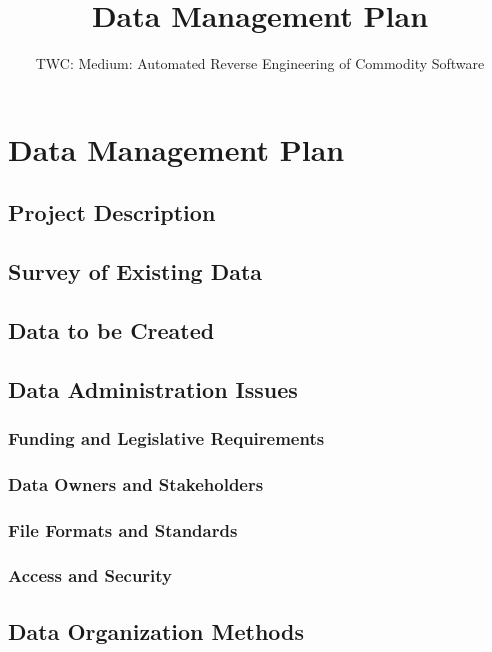 \documentclass[letterpaper,twoside,11pt,headings=small]{scrartcl}
\newcommand{\thetitle}{TWC: Medium: Automated Reverse Engineering of Commodity Software\xspace}
\begin{document}
\title{Data Management Plan}
\subtitle{\thetitle}
\author{}
\date{}
\maketitle

\section{Data Management Plan}
\label{sec:dmp}

\subsection{Project Description}
\label{sec:dmp:desc}

\subsection{Survey of Existing Data}
\label{sec:dmp:survey}

\subsection{Data to be Created}
\label{sec:dmp:created}

\subsection{Data Administration Issues}
\label{sec:dmp:admin}

\subsubsection*{Funding and Legislative Requirements}

\subsubsection*{Data Owners and Stakeholders}

\subsubsection*{File Formats and Standards}

\subsubsection*{Access and Security}

\subsection{Data Organization Methods}
\end{document}
